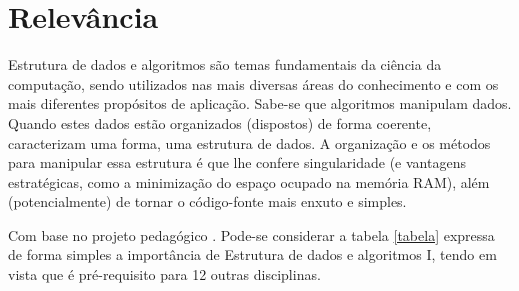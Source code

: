 \documentclass[10pt]{article}
\begin{document}
\section{Relevância}
Estrutura de dados e algoritmos são temas fundamentais da ciência da computação, sendo utilizados nas mais diversas áreas do conhecimento e com os mais diferentes propósitos de aplicação. Sabe-se que algoritmos manipulam dados. Quando estes dados estão organizados (dispostos) de forma coerente, caracterizam uma forma, uma estrutura de dados. A organização e os métodos para manipular essa estrutura é que lhe confere singularidade (e vantagens estratégicas, como a minimização do espaço ocupado na memória RAM), além (potencialmente) de tornar o código-fonte mais enxuto e simples. 

Com base no projeto pedagógico \cite{Projeto}. Pode-se considerar a tabela \ref{tabela} expressa de forma simples a importância de Estrutura de dados e algoritmos I, tendo em vista  que é pré-requisito para 12 outras disciplinas.
    
\end{document}
